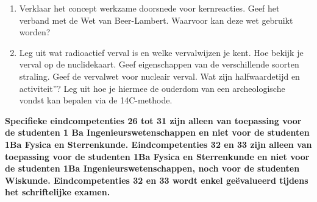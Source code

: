 \documentclass[12pt]{article}
\begin{document}
\begin{enumerate}
        \item Verklaar het concept werkzame doorsnede voor kernreacties. Geef het verband met de Wet van Beer-Lambert. Waarvoor kan deze wet gebruikt worden?
        \item Leg uit wat radioactief verval is en welke vervalwijzen je kent. Hoe bekijk je verval op de nuclidekaart. Geef eigenschappen van de verschillende soorten straling. Geef de vervalwet voor nucleair verval. Wat zijn halfwaardetijd en activiteit”? Leg uit hoe je hiermee de ouderdom van een archeologische vondst kan bepalen via de 14C-methode.
    \end{enumerate}
    {\bf Specifieke eindcompetenties 26 tot 31 zijn alleen van toepassing voor de studenten 1 Ba Ingenieurswetenschappen en niet voor de studenten 1Ba Fysica en Sterrenkunde. Eindcompetenties 32 en 33 zijn alleen van toepassing voor de studenten 1Ba Fysica en Sterrenkunde en niet voor de studenten 1Ba Ingenieurswetenschappen, noch voor de studenten Wiskunde. Eindcompetenties 32 en 33 wordt enkel geëvalueerd tijdens het schriftelijke examen.}
\end{document}
